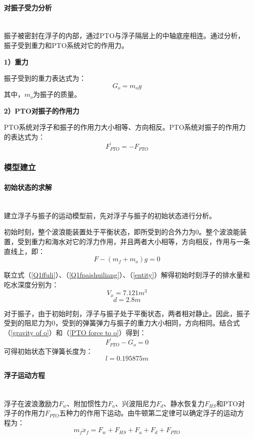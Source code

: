 \documentclass{my_paper}
\newcommand{\subsubsubsection}[1]{\paragraph{#1}\mbox{}\\}
\begin{document}
\subsubsubsection{对振子受力分析}

振子被密封在浮子的内部，通过PTO与浮子隔层上的中轴底座相连。通过分析，振子受到重力和PTO系统对它的作用力。

\textbf{1）重力}

振子受到的重力表达式为：
\begin{equation}\label{gravity of o}
    G_{o}=m_{o}g 
\end{equation}
其中，$m_{o}$为振子的质量。

\textbf{2）PTO对振子的作用力}

PTO系统对浮子和振子的作用力大小相等、方向相反。PTO系统对振子的作用力的表达式为：
\begin{equation}\label{PTO force to o}
    F_{PTO}^{'}=-F_{PTO} 
\end{equation}

\newpage
\subsubsection{模型建立}

\subsubsubsection{初始状态的求解}

建立浮子与振子的运动模型前，先对浮子与振子的初始状态进行分析。

初始时刻，整个波浪能装置处于平衡状态，即所受到的合外力为$0$。整个波浪能装置，受到重力和海水对它的浮力作用，并且两者大小相等，方向相反，作用与一条直线上，即：
\begin{equation}
    F-(m_{f}+m_{o})g=0 \label{entity}
\end{equation}

联立式（\ref{Q1ffuli}）、（\ref{Q1fpaishuiliang}）、（\ref{entity}）解得初始时刻浮子的排水量和吃水深度分别为：
$$
V_{x}=7.121m^3
$$
$$
d=2.8m
$$

对于振子，由于初始时刻，浮子与振子处于平衡状态，两者相对静止。因此，振子受到的阻尼力为0，受到的弹簧弹力与振子的重力大小相同，方向相同。结合式（\ref{gravity of o}）和（\ref{PTO force to o}）得到：
\begin{equation}
    F_{PTO}^{'}-G_{o}=0
\end{equation}
可得初始状态下弹簧长度为：
$$
l=0.195875m
$$

\subsubsubsection{浮子运动方程}

浮子在波浪激励力$F_w$、附加惯性力$F_a$、兴波阻尼力$F_d$、静水恢复力$F_{HS}$和PTO对浮子的作用力$F_{PTO}$五种力的作用下运动。由牛顿第二定律可以确定浮子的运动方程为：
\begin{equation}
    m_f \ddot x_f = F_w+F_{HS}+F_a+F_d+F_{PTO}
\end{equation}
\end{document}
